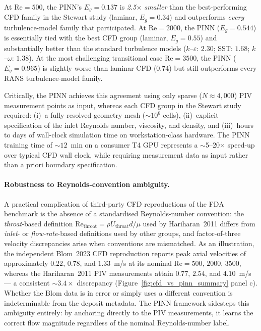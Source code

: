 \documentclass[12pt,a4paper]{article}
\newcommand{\Reyn}{\mathrm{Re}}    %
\begin{document}
At $\Reyn = 500$, the PINN's $E_g = 0.137$ is
\emph{2.5$\times$ smaller} than the best-performing CFD family
in the Stewart study (laminar, $E_g = 0.34$) and outperforms
\emph{every} turbulence-model family that participated. At
$\Reyn = 2000$, the PINN ($E_g = 0.544$) is essentially tied
with the best CFD group (laminar, $E_g = 0.55$) and
substantially better than the standard turbulence models
($k$--$\varepsilon$: $2.30$; SST: $1.68$; $k$--$\omega$:
$1.38$). At the most challenging transitional case
$\Reyn = 3500$, the PINN ($E_g = 0.965$) is slightly worse
than laminar CFD ($0.74$) but still outperforms every
RANS turbulence-model family.

Critically, the PINN achieves this agreement using only sparse
($N \approx 4{,}000$) PIV measurement points as input, whereas each
CFD group in the Stewart study required: (i)~a fully resolved
geometry mesh ($\sim\!10^6$ cells), (ii)~explicit specification of
the inlet Reynolds number, viscosity, and density, and (iii)~hours
to days of wall-clock simulation time on workstation-class
hardware. The PINN training time of $\sim\!12$~min on a consumer T4
GPU represents a $\sim$5--20$\times$ speed-up over typical CFD wall
clock, while requiring measurement data as input rather than a
priori boundary specification.

\paragraph{Robustness to Reynolds-convention ambiguity.}
A practical complication of third-party CFD reproductions of the
FDA benchmark is the absence of a standardised Reynolds-number
convention: the \emph{throat}-based definition
$\Reyn_{\text{throat}} = \rho U_{\text{throat}} d / \mu$ used by
Hariharan~2011 \cite{Hariharan2011FDA} differs from \emph{inlet}-
or \emph{flow-rate}-based definitions used by other groups, and
factor-of-three velocity discrepancies arise when conventions are
mismatched. As an illustration, the independent Blom~2023 CFD
reproduction reports peak axial velocities of approximately
$0.22$, $0.78$, and $1.33$~m/s at its nominal $\Reyn = 500$,
$2000$, $3500$, whereas the Hariharan~2011 PIV measurements
attain $0.77$, $2.54$, and $4.10$~m/s --- a consistent
$\sim\!3.4\times$ discrepancy
(Figure~\ref{fig:cfd_vs_pinn_summary} panel c). Whether the Blom
data is in error or simply uses a different convention is
indeterminable from the deposit metadata. The PINN framework
sidesteps this ambiguity entirely: by anchoring directly to the
PIV measurements, it learns the correct flow magnitude
regardless of the nominal Reynolds-number label.
\end{document}
